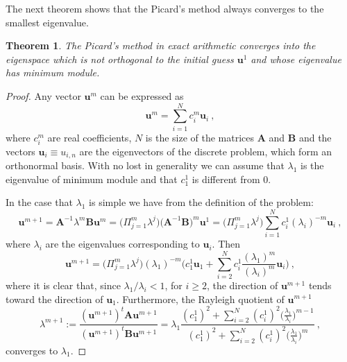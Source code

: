 \documentclass[preprint,12pt]{elsarticle}
\newtheorem{theorem}{Theorem}[section]
\begin{document}

The next theorem shows that the Picard's method always converges to the smallest eigenvalue.

\begin{theorem}\label{th:picard_conv}
The Picard's method in exact arithmetic converges into the eigenspace which is not orthogonal to the initial guess $\mathbf{u}^1$ and whose eigenvalue has minimum module.
\end{theorem}

\begin{proof}
Any vector $\mathbf{u}^m$ can be expressed as 
$$
\mathbf{u}^m=\sum_{i=1}^N c_i^m \mathbf{u}_i\ ,
$$
where $c_i^m$ are real coefficients, $N$ is the size of the matrices $\mathbf{A}$ and $\mathbf{B}$ and the vectors $\mathbf{u}_i\equiv u_{i,n}$ are the eigenvectors of the discrete problem, which form an orthonormal basis.
With no lost in generality we can assume that $\lambda_1$ is the eigenvalue of minimum module and that $c_1^1$ is different from 0.

In the case that $\lambda_1$ is simple we have from the definition of the problem:
$$
\mathbf{u}^{m+1}=\mathbf{A}^{-1}\lambda^m\mathbf{B}\mathbf{u}^{m}
=\Big(\Pi_{j=1}^m\lambda^{j}\Big)\Big(\mathbf{A}^{-1}\mathbf{B}\Big)^m\mathbf{u}^1
=\Big(\Pi_{j=1}^m\lambda^{j}\Big)\sum_{i=1}^N c_i^1 (\lambda_i)^{-m}\mathbf{u}_i\ ,
$$
where $\lambda_i$ are the eigenvalues corresponding to $\mathbf{u}_i$.
Then
$$
\mathbf{u}^{m+1}=\Big(\Pi_{j=1}^m\lambda^{j}\Big)(\lambda_1)^{-m}\Big( c_1^1 \mathbf{u}_1 +
\sum_{i=2}^N c_i^1\frac{(\lambda_1)^m}{(\lambda_i)^{m}}\mathbf{u}_i\Big) \ ,
$$
where it is clear that, since $\lambda_1/\lambda_i<1$, for $i\ge 2$, the direction of $\mathbf{u}^{m+1}$ tends toward the direction of $\mathbf{u}_1$. Furthermore, the Rayleigh quotient of $\mathbf{u}^{m+1}$
$$
\lambda^{m+1}:=\frac{(\mathbf{u}^{m+1})^t\mathbf{A}\mathbf{u}^{m+1}}{(\mathbf{u}^{m+1})^t\mathbf{B}\mathbf{u}^{m+1}}
=\lambda_1 \frac{\displaystyle(c_1^1)^2 +
\sum_{i=2}^N (c_i^1)^2\Bigg(\frac{\lambda_1}{\lambda_i}\Bigg)^{m-1}}
{\displaystyle(c_1^1)^2 +
\sum_{i=2}^N (c_i^1)^2\Bigg(\frac{\lambda_1}{\lambda_i}\Bigg)^{m}}\ ,
$$
converges to $\lambda_1$.


\end{proof}
\end{document}
